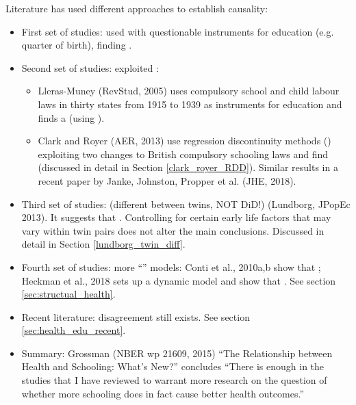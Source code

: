         Literature has used different approaches to establish causality:
        \begin{itemize}
            \item First set of studies: used  with questionable instruments for education (e.g. quarter of birth), finding .
            \item Second set of studies: exploited :
            \begin{itemize}
                \item Lleras-Muney (RevStud, 2005) uses compulsory school and child labour laws in thirty states from 1915 to 1939 as instruments for education and finds a  (using ).
                \item Clark and Royer (AER, 2013) use regression discontinuity methods () exploiting two changes to British compulsory schooling laws and find  (discussed in detail in Section \ref{clark_royer_RDD}). Similar results in a recent paper by Janke, Johnston, Propper et al. (JHE, 2018).
            \end{itemize}
            \item Third set of studies:  (different between twins, NOT DiD!) (Lundborg, JPopEc 2013). It suggests that . Controlling for certain early life factors that may vary within twin pairs does not alter the main conclusions. Discussed in detail in Section \ref{lundborg_twin_diff}.
            \item Fourth set of studies: more “” models: Conti et al., 2010a,b show that ; Heckman et al., 2018 sets up a dynamic model and show that . See section \ref{sec:structual_health}.
            \item Recent literature: disagreement still exists. See section \ref{sec:health_edu_recent}.
            \item Summary: Grossman (NBER wp 21609, 2015) “The Relationship between Health and Schooling: What’s New?” concludes “There is enough  in the studies that I have reviewed to warrant more research on the question of whether more schooling does in fact cause better health outcomes.”
        \end{itemize}

